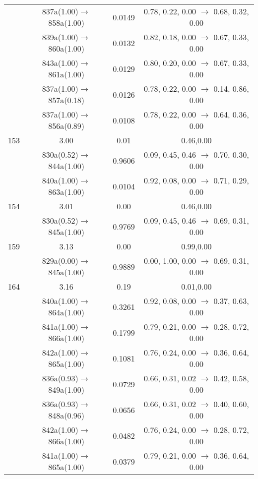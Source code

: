 \documentclass[10pt,a4paper]{article}
\begin{document}
\begin{longtable}{c|c|c|c}
 	& 837a(1.00)$\rightarrow$858a(1.00) &	 0.0149 &	 0.78, 0.22, 0.00 $\rightarrow$ 0.68, 0.32, 0.00 \\ 
 	& 839a(1.00)$\rightarrow$860a(1.00) &	 0.0132 &	 0.82, 0.18, 0.00 $\rightarrow$ 0.67, 0.33, 0.00 \\ 
 	& 843a(1.00)$\rightarrow$861a(1.00) &	 0.0129 &	 0.80, 0.20, 0.00 $\rightarrow$ 0.67, 0.33, 0.00 \\ 
 	& 837a(1.00)$\rightarrow$857a(0.18) &	 0.0126 &	 0.78, 0.22, 0.00 $\rightarrow$ 0.14, 0.86, 0.00 \\ 
 	& 837a(1.00)$\rightarrow$856a(0.89) &	 0.0108 &	 0.78, 0.22, 0.00 $\rightarrow$ 0.64, 0.36, 0.00 \\ 
 \hline153 &	 3.00 &	 0.01 &	 0.46,0.00 \\ 
  	& 830a(0.52)$\rightarrow$844a(1.00) &	 0.9606 &	 0.09, 0.45, 0.46 $\rightarrow$ 0.70, 0.30, 0.00 \\ 
 	& 840a(1.00)$\rightarrow$863a(1.00) &	 0.0104 &	 0.92, 0.08, 0.00 $\rightarrow$ 0.71, 0.29, 0.00 \\ 
 \hline154 &	 3.01 &	 0.00 &	 0.46,0.00 \\ 
  	& 830a(0.52)$\rightarrow$845a(1.00) &	 0.9769 &	 0.09, 0.45, 0.46 $\rightarrow$ 0.69, 0.31, 0.00 \\ 
 \hline159 &	 3.13 &	 0.00 &	 0.99,0.00 \\ 
  	& 829a(0.00)$\rightarrow$845a(1.00) &	 0.9889 &	 0.00, 1.00, 0.00 $\rightarrow$ 0.69, 0.31, 0.00 \\ 
 \hline164 &	 3.16 &	 0.19 &	 0.01,0.00 \\ 
  	& 840a(1.00)$\rightarrow$864a(1.00) &	 0.3261 &	 0.92, 0.08, 0.00 $\rightarrow$ 0.37, 0.63, 0.00 \\ 
 	& 841a(1.00)$\rightarrow$866a(1.00) &	 0.1799 &	 0.79, 0.21, 0.00 $\rightarrow$ 0.28, 0.72, 0.00 \\ 
 	& 842a(1.00)$\rightarrow$865a(1.00) &	 0.1081 &	 0.76, 0.24, 0.00 $\rightarrow$ 0.36, 0.64, 0.00 \\ 
 	& 836a(0.93)$\rightarrow$849a(1.00) &	 0.0729 &	 0.66, 0.31, 0.02 $\rightarrow$ 0.42, 0.58, 0.00 \\ 
 	& 836a(0.93)$\rightarrow$848a(0.96) &	 0.0656 &	 0.66, 0.31, 0.02 $\rightarrow$ 0.40, 0.60, 0.00 \\ 
 	& 842a(1.00)$\rightarrow$866a(1.00) &	 0.0482 &	 0.76, 0.24, 0.00 $\rightarrow$ 0.28, 0.72, 0.00 \\ 
 	& 841a(1.00)$\rightarrow$865a(1.00) &	 0.0379 &	 0.79, 0.21, 0.00 $\rightarrow$ 0.36, 0.64, 0.00 \\ 

\end{longtable}
\end{document}
